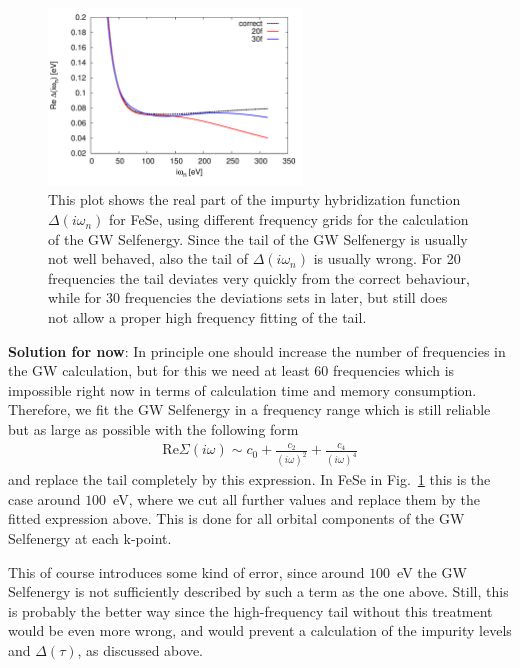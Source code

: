 \documentclass[12pt,a4paper]{scrartcl}
\numberwithin{equation}{section}
\begin{document}
\begin{figure}[h]
\begin{center}
\includegraphics[width=0.6\textwidth]{figs/freqdep/FeSe_hybrid_tail.pdf} 
\end{center}
\caption{This plot shows the real part of the impurty hybridization function
$\Delta(i\omega_n)$ for FeSe, using different frequency grids for the
calculation of the GW Selfenergy. Since the tail of the GW Selfenergy
is usually not well behaved, also the tail of
$\Delta(i\omega_n)$ is usually wrong. For 20 frequencies the tail deviates
very quickly from the correct behaviour, while for 30 
frequencies the deviations sets in later, but still does not allow a proper
high frequency fitting of the tail.}
\label{fig:FeSe_hybrid_tail}
\end{figure}

\textbf{Solution for now}: In principle one should increase the number of
frequencies in the GW calculation, but for this we need at least 60 frequencies
which is impossible right now in terms of calculation time and memory consumption.
Therefore, we fit the GW Selfenergy in a frequency range which is still reliable
but as large as possible with the following form
\begin{align}
\mathrm{Re}\Sigma(i\omega) \sim  c_0 + \frac{c_2}{(i\omega)^2} + \frac{c_4}{(i\omega)^4}
\end{align}
and replace the tail completely by this expression.
In FeSe in Fig.~\ref{fig:FeSe_hybrid_tail} this is the case around $100$~eV,
where we cut all further values and replace them by the fitted expression above.
This is done for all orbital components of the GW Selfenergy at each k-point.

This of course introduces some kind of error, since around $100$~eV
the GW Selfenergy is not sufficiently described by such a term as the one above.
Still, this is probably the better way since the high-frequency tail without 
this treatment would be even more wrong, and would prevent a calculation of 
the impurity levels and $\Delta(\tau)$, as discussed above.
\end{document}
